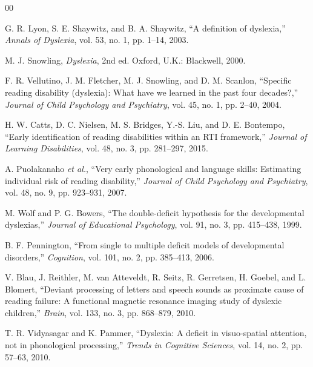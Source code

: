 \documentclass[conference]{IEEEtran}
\begin{document}
\begin{thebibliography}{00}

G. R. Lyon, S. E. Shaywitz, and B. A. Shaywitz, ``A definition of dyslexia,'' \textit{Annals of Dyslexia}, vol. 53, no. 1, pp. 1--14, 2003.

M. J. Snowling, \textit{Dyslexia}, 2nd ed. Oxford, U.K.: Blackwell, 2000.

F. R. Vellutino, J. M. Fletcher, M. J. Snowling, and D. M. Scanlon, ``Specific reading disability (dyslexia): What have we learned in the past four decades?,'' \textit{Journal of Child Psychology and Psychiatry}, vol. 45, no. 1, pp. 2--40, 2004.

H. W. Catts, D. C. Nielsen, M. S. Bridges, Y.-S. Liu, and D. E. Bontempo, ``Early identification of reading disabilities within an RTI framework,'' \textit{Journal of Learning Disabilities}, vol. 48, no. 3, pp. 281--297, 2015.

A. Puolakanaho \textit{et al.}, ``Very early phonological and language skills: Estimating individual risk of reading disability,'' \textit{Journal of Child Psychology and Psychiatry}, vol. 48, no. 9, pp. 923--931, 2007.

M. Wolf and P. G. Bowers, ``The double-deficit hypothesis for the developmental dyslexias,'' \textit{Journal of Educational Psychology}, vol. 91, no. 3, pp. 415--438, 1999.

B. F. Pennington, ``From single to multiple deficit models of developmental disorders,'' \textit{Cognition}, vol. 101, no. 2, pp. 385--413, 2006.

V. Blau, J. Reithler, M. van Atteveldt, R. Seitz, R. Gerretsen, H. Goebel, and L. Blomert, ``Deviant processing of letters and speech sounds as proximate cause of reading failure: A functional magnetic resonance imaging study of dyslexic children,'' \textit{Brain}, vol. 133, no. 3, pp. 868--879, 2010.

T. R. Vidyasagar and K. Pammer, ``Dyslexia: A deficit in visuo-spatial attention, not in phonological processing,'' \textit{Trends in Cognitive Sciences}, vol. 14, no. 2, pp. 57--63, 2010.

\end{thebibliography}
\end{document}
